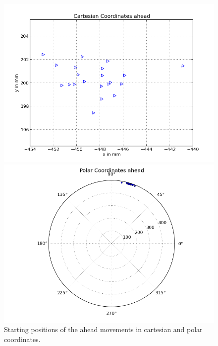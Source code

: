 \documentclass{scrartcl}
\begin{document}
\begin{figure}[H]
\centering
\begin{minipage}{.5\textwidth}
  \centering
  \includegraphics[width=.8\linewidth]{img/ahead_s.png}
\end{minipage}%
\begin{minipage}{.5\textwidth}
  \centering
  \includegraphics[width=.8\linewidth]{img/ahead_pc_s.png}
\end{minipage}
\caption{Starting positions of the ahead movements in cartesian and polar coordinates.}
\label{fig:ahead_s}
\end{figure}
\end{document}
